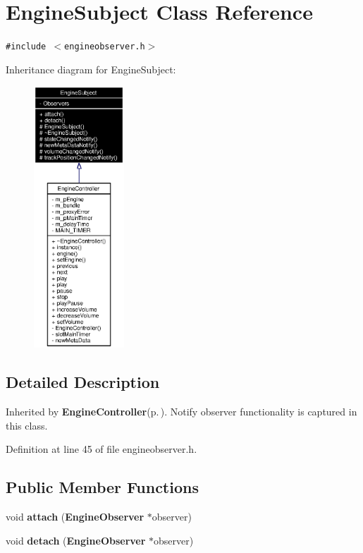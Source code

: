\section{Engine\-Subject Class Reference}
\label{classEngineSubject}
{\tt \#include $<$engineobserver.h$>$}

Inheritance diagram for Engine\-Subject:\begin{figure}[H]
\begin{center}
\leavevmode
\includegraphics[width=96pt]{classEngineSubject__inherit__graph}
\end{center}
\end{figure}


\subsection{Detailed Description}
Inherited by {\bf Engine\-Controller}{\rm (p.\,\pageref{classEngineController})}. Notify observer functionality is captured in this class. 



Definition at line 45 of file engineobserver.h.\subsection*{Public Member Functions}
\begin{CompactItemize}
\item 
void {\bf attach} ({\bf Engine\-Observer} $\ast$observer)
\item 
void {\bf detach} ({\bf Engine\-Observer} $\ast$observer)
\end{CompactItemize}
